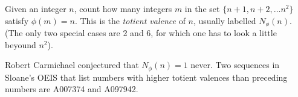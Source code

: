 \documentclass[12pt]{article}
\begin{document}
Given an integer $n$, count how many integers $m$ in the set $\{n + 1, n + 2, \ldots n^2\}$ satisfy $\phi(m) = n$. This is the {\em totient valence} of $n$, usually labelled $N_{\phi}(n)$. (The only two special cases are 2 and 6, for which one has to look a little beyound $n^2$).

Robert Carmichael conjectured that $N_{\phi}(n) = 1$ never. Two sequences in Sloane's OEIS that list numbers with higher totient valences than preceding numbers are A007374 and A097942.
\end{document}
